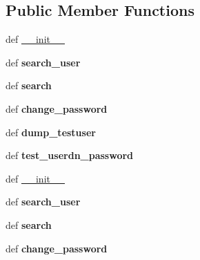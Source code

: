 \subsection*{Public Member Functions}
\begin{DoxyCompactItemize}
\item 
def \hyperlink{classldap_1_1ldap_1_1LDAPConnection_a7f55602eaeb5d3e6d6076850ef1effbd}{\-\_\-\-\_\-init\-\_\-\-\_\-}
\item 
\hypertarget{classldap_1_1ldap_1_1LDAPConnection_a8a21a52d52537ec1b508768214698540}{def {\bfseries search\-\_\-user}}\label{classldap_1_1ldap_1_1LDAPConnection_a8a21a52d52537ec1b508768214698540}

\item 
\hypertarget{classldap_1_1ldap_1_1LDAPConnection_ab11fe1e8f34ce63cb12b78aa75aec55d}{def {\bfseries search}}\label{classldap_1_1ldap_1_1LDAPConnection_ab11fe1e8f34ce63cb12b78aa75aec55d}

\item 
\hypertarget{classldap_1_1ldap_1_1LDAPConnection_a1c7661061babcba2c8625fc929cc99cc}{def {\bfseries change\-\_\-password}}\label{classldap_1_1ldap_1_1LDAPConnection_a1c7661061babcba2c8625fc929cc99cc}

\item 
\hypertarget{classldap_1_1ldap_1_1LDAPConnection_a8b034f2c41f799d27c8e7982a2af5f5b}{def {\bfseries dump\-\_\-testuser}}\label{classldap_1_1ldap_1_1LDAPConnection_a8b034f2c41f799d27c8e7982a2af5f5b}

\item 
\hypertarget{classldap_1_1ldap_1_1LDAPConnection_aaa167752ae9dff812be4b2598fae1d5b}{def {\bfseries test\-\_\-userdn\-\_\-password}}\label{classldap_1_1ldap_1_1LDAPConnection_aaa167752ae9dff812be4b2598fae1d5b}

\item 
def \hyperlink{classldap_1_1ldap_1_1LDAPConnection_a7f55602eaeb5d3e6d6076850ef1effbd}{\-\_\-\-\_\-init\-\_\-\-\_\-}
\item 
\hypertarget{classldap_1_1ldap_1_1LDAPConnection_a8a21a52d52537ec1b508768214698540}{def {\bfseries search\-\_\-user}}\label{classldap_1_1ldap_1_1LDAPConnection_a8a21a52d52537ec1b508768214698540}

\item 
\hypertarget{classldap_1_1ldap_1_1LDAPConnection_ab11fe1e8f34ce63cb12b78aa75aec55d}{def {\bfseries search}}\label{classldap_1_1ldap_1_1LDAPConnection_ab11fe1e8f34ce63cb12b78aa75aec55d}

\item 
\hypertarget{classldap_1_1ldap_1_1LDAPConnection_a1c7661061babcba2c8625fc929cc99cc}{def {\bfseries change\-\_\-password}}\label{classldap_1_1ldap_1_1LDAPConnection_a1c7661061babcba2c8625fc929cc99cc}


\end{DoxyCompactItemize}
